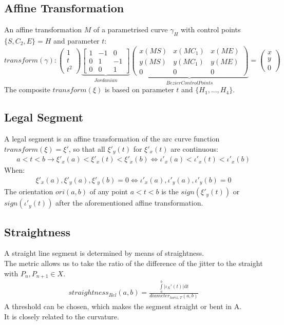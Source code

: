 \documentclass{report}
\begin{document}
\subsection{Affine Transformation}
An affine transformation $M$ of a parametrised curve $\gamma_{H}$ with control points $\{S,C_{2},E\} = H$ and parameter $t$:
\begin{equation}
transform(\gamma):
\begin{pmatrix}
1 \\
t \\
t^2
\end{pmatrix}
\underbrace{\begin{bmatrix}
1 & -1 & 0\\
0 & 1 & -1\\
0 & 0 &1
\end{bmatrix}}_{Jordanian}
\underbrace{\begin{pmatrix}
x(MS) & x(MC_{1}) & x(ME) \\
y(MS) & y(MC_{1}) & y(ME) \\
0 & 0 & 0
\end{pmatrix}}_{Bezier Control Points}
=
\begin{pmatrix}
x \\
y \\
0
\end{pmatrix}
\end{equation}
The composite $transform(\xi)$ is based on parameter $t$ and $\{H_{1}, ... ,H_{4}\}$. ~\cite[Spline\_Axioms.tex]{Stopeight}

\subsection{Legal Segment}
A legal segment is an affine transformation of the arc curve function $transform(\xi) = \xi'$, so that all $\xi'_{y}(t)$ for $\xi'_{x}(t)$ are continuous:
\begin{align}
a<t<b\rightarrow \xi'_{x}(a)<\xi'_{x}(t)<\xi'_{x}(b) \Leftrightarrow \iota'_{x}(a)<\iota'_{x}(t)<\iota'_{x}(b)
\end{align}
When:
\begin{align}
\xi'_{x}(a),\xi'_{y}(a), \xi'_{y}(b) = 0 \Leftrightarrow \iota'_{x}(a),\iota'_{y}(a), \iota'_{y}(b) = 0
\end{align}
The orientation $ori(a,b)$ of any point $a < t < b$ is the $sign(\xi'_{y}(t))$ or $sign(\iota'_{y}(t))$ after the aforementioned affine transformation.

\subsection{Straightness}
A straight line segment is determined by means of straightness.\\
The metric allows us to take the ratio of the difference of the jitter to the straight with $P_{n},P_{n+1} \in X$. \\
\begin{align}
straightness_{Rel}(a,b)=\frac{\int \limits _{a}^{b} \lvert \iota_{X}'(t) \rvert \mathrm{d}t}{diameter_{horiz,T}(a,b)}
\end{align}
A threshold can be chosen, which makes the segment straight or bent in A.\\
It is closely related to the curvature.
\end{document}
